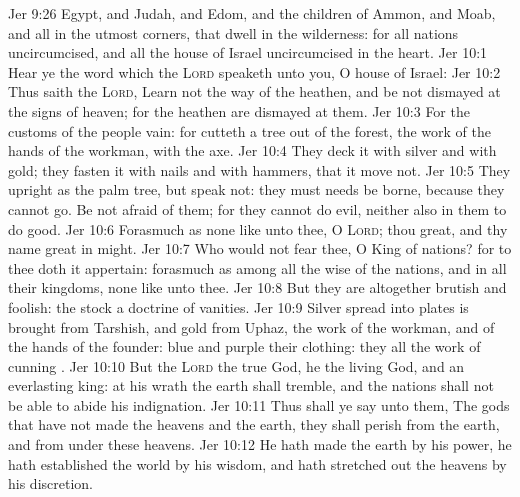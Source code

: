 \vs Jer 9:26 Egypt, and Judah, and Edom, and the children of Ammon, and Moab, and all  in the utmost corners, that dwell in the wilderness: for all  nations  uncircumcised, and all the house of Israel  uncircumcised in the heart.
\vs Jer 10:1 Hear ye the word which the \textsc{Lord} speaketh unto you, O house of Israel:
\vs Jer 10:2 Thus saith the \textsc{Lord}, Learn not the way of the heathen, and be not dismayed at the signs of heaven; for the heathen are dismayed at them.
\vs Jer 10:3 For the customs of the people  vain: for  cutteth a tree out of the forest, the work of the hands of the workman, with the axe.
\vs Jer 10:4 They deck it with silver and with gold; they fasten it with nails and with hammers, that it move not.
\vs Jer 10:5 They  upright as the palm tree, but speak not: they must needs be borne, because they cannot go. Be not afraid of them; for they cannot do evil, neither also  in them to do good.
\vs Jer 10:6 Forasmuch as  none like unto thee, O \textsc{Lord}; thou  great, and thy name  great in might.
\vs Jer 10:7 Who would not fear thee, O King of nations? for to thee doth it appertain: forasmuch as among all the wise  of the nations, and in all their kingdoms,  none like unto thee.
\vs Jer 10:8 But they are altogether brutish and foolish: the stock  a doctrine of vanities.
\vs Jer 10:9 Silver spread into plates is brought from Tarshish, and gold from Uphaz, the work of the workman, and of the hands of the founder: blue and purple  their clothing: they  all the work of cunning .
\vs Jer 10:10 But the \textsc{Lord}  the true God, he  the living God, and an everlasting king: at his wrath the earth shall tremble, and the nations shall not be able to abide his indignation.
\vs Jer 10:11 Thus shall ye say unto them, The gods that have not made the heavens and the earth,  they shall perish from the earth, and from under these heavens.
\vs Jer 10:12 He hath made the earth by his power, he hath established the world by his wisdom, and hath stretched out the heavens by his discretion.
